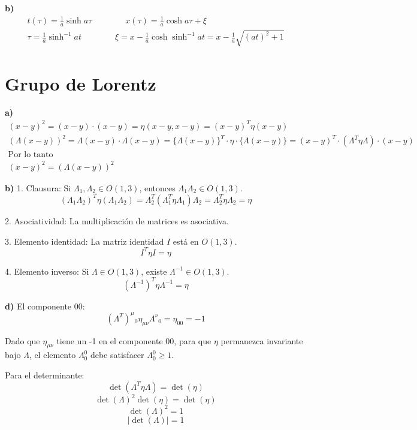 \documentclass{article}
\begin{document}
\textbf{b) } 
\begin{gather*}
   t(\tau ) = \frac{1}{a } \sinh{a\tau } \qquad \qquad x(\tau ) = \frac{1}{a } \cosh{a\tau} + \xi \\
   \tau = \frac{1}{a } \sinh ^ {-1 }{ at }  \qquad \qquad \xi = x - \frac{1}{a } \cosh{\sinh ^ {-1 }{at}} = x - \frac{1}{a } \sqrt{(at)^2 + 1} 
\end{gather*}




\section{Grupo de Lorentz }
\textbf{a) } 
\begin{gather}
  (x-y)^2 = (x-y) \cdot (x-y ) = \eta (x-y,x-y) = (x-y)^T \eta (x-y) \\
  (\Lambda (x-y))^2 = \Lambda(x-y) \cdot \Lambda(x-y) = \{ \Lambda(x-y) \}^T \cdot \eta \cdot \{ \Lambda(x-y) \} = (x-y)^T \cdot (\Lambda^T \eta \Lambda) \cdot (x-y)\\
  \text{Por lo tanto }\\
  (x-y)^2 = (\Lambda (x-y))^2
\end{gather}

\textbf{b) }
1. Clausura: Si \(\Lambda_1, \Lambda_2 \in O(1,3)\), entonces \(\Lambda_1 \Lambda_2 \in O(1,3)\).
   \[
   (\Lambda_1 \Lambda_2)^T \eta (\Lambda_1 \Lambda_2) = \Lambda_2^T (\Lambda_1^T \eta \Lambda_1) \Lambda_2 = \Lambda_2^T \eta \Lambda_2 = \eta
   \]

2. Asociatividad: La multiplicación de matrices es asociativa.

3. Elemento identidad: La matriz identidad \(I\) está en \(O(1,3)\).
   \[
   I^T \eta I = \eta
   \]

4. Elemento inverso: Si \(\Lambda \in O(1,3)\), existe \(\Lambda^{-1} \in O(1,3)\).
   \[
   (\Lambda^{-1})^T \eta \Lambda^{-1} = \eta
   \]

\textbf{d) }
El componente 00:
\[ 
(\Lambda^T)^\mu{}_0 \eta_{\mu\nu} \Lambda^\nu{}_0 = \eta_{00} = -1 
\]

Dado que \(\eta_{\mu\nu}\) tiene un -1 en el componente 00, para que \(\eta\) permanezca invariante bajo \(\Lambda\), el elemento \(\Lambda^0_0\) debe satisfacer \(\Lambda^0_0 \geq 1\).

Para el determinante:
\[ 
\det(\Lambda^T \eta \Lambda) = \det(\eta) 
\]
\[ 
\det(\Lambda)^2 \det(\eta) = \det(\eta) 
\]
\[ 
\det(\Lambda)^2 = 1 
\]
\[ 
|\det(\Lambda)| = 1 
\]

\hfill
\end{document}

